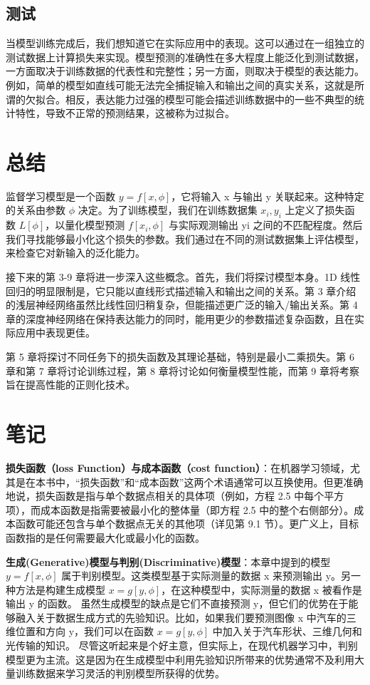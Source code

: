 \documentclass[lang=cn,newtx,10pt,scheme=chinese]{elegantbook}
\begin{document}
\subsection{测试}

当模型训练完成后，我们想知道它在实际应用中的表现。这可以通过在一组独立的测试数据上计算损失来实现。模型预测的准确性在多大程度上能泛化到测试数据，一方面取决于训练数据的代表性和完整性；另一方面，则取决于模型的表达能力。例如，简单的模型如直线可能无法完全捕捉输入和输出之间的真实关系，这就是所谓的欠拟合。相反，表达能力过强的模型可能会描述训练数据中的一些不典型的统计特性，导致不正常的预测结果，这被称为过拟合。

\section{总结}

监督学习模型是一个函数 $y = f[x, \phi]$，它将输入 x 与输出 y 关联起来。这种特定的关系由参数 \(\phi\) 决定。为了训练模型，我们在训练数据集 {$x_i, y_i$} 上定义了损失函数 $L[\phi]$，以量化模型预测 $f[x_i,\phi]$ 与实际观测输出 yi 之间的不匹配程度。然后我们寻找能够最小化这个损失的参数。我们通过在不同的测试数据集上评估模型，来检查它对新输入的泛化能力。

接下来的第 3-9 章将进一步深入这些概念。首先，我们将探讨模型本身。1D 线性回归的明显限制是，它只能以直线形式描述输入和输出之间的关系。第 3 章介绍的浅层神经网络虽然比线性回归稍复杂，但能描述更广泛的输入/输出关系。第 4 章的深度神经网络在保持表达能力的同时，能用更少的参数描述复杂函数，且在实际应用中表现更佳。

第 5 章将探讨不同任务下的损失函数及其理论基础，特别是最小二乘损失。第 6 章和第 7 章将讨论训练过程，第 8 章将讨论如何衡量模型性能，而第 9 章将考察旨在提高性能的正则化技术。

\section{笔记}

\textbf{损失函数（loss Function）与成本函数（cost function）}：在机器学习领域，尤其是在本书中，“损失函数”和“成本函数”这两个术语通常可以互换使用。但更准确地说，损失函数是指与单个数据点相关的具体项（例如，方程 2.5 中每个平方项），而成本函数是指需要被最小化的整体量（即方程 2.5 中的整个右侧部分）。成本函数可能还包含与单个数据点无关的其他项（详见第 9.1 节）。更广义上，目标函数指的是任何需要最大化或最小化的函数。

\textbf{生成(Generative)模型与判别(Discriminative)模型}：本章中提到的模型 $y = f[x, \phi]$ 属于判别模型。这类模型基于实际测量的数据 x 来预测输出 y。另一种方法是构建生成模型 $x = g[y, \phi]$，在这种模型中，实际测量的数据 x 被看作是输出 y 的函数。
虽然生成模型的缺点是它们不直接预测 y，但它们的优势在于能够融入关于数据生成方式的先验知识。比如，如果我们要预测图像 x 中汽车的三维位置和方向 y，我们可以在函数 $x = g[y, \phi]$ 中加入关于汽车形状、三维几何和光传输的知识。
尽管这听起来是个好主意，但实际上，在现代机器学习中，判别模型更为主流。这是因为在生成模型中利用先验知识所带来的优势通常不及利用大量训练数据来学习灵活的判别模型所获得的优势。
\end{document}

